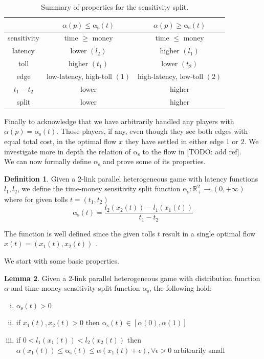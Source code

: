 \documentclass[10pt,a4paper]{book}
\newcommand{\as}{\mathrm{\alpha_s}}
\newcommand{\R}{\mathbb{R}}
\theoremstyle{definition}
\newtheorem{definition}{Definition}[chapter]
\newtheorem{lemma}[definition]{Lemma}
\theoremstyle{comment}
\begin{document}
\begin{table}[h!]
	\centering
	\caption{Summary of properties for the sensitivity split.}
	\begin{tabular}{| c || c | c |}
		\hline
		& $\alpha(p) \le \as(t)$ & $\alpha(p) \ge \as(t)$ \\ \hline
		sensitivity & time $\ge$ money & time $\le$ money \\ \hline
		latency & lower $(l_2)$ & higher $(l_1)$ \\ \hline
		toll & higher $(t_1)$ & lower $(t_2)$ \\ \hline
		edge & low-latency, high-toll $(1)$ & high-latency, low-toll $(2)$ \\ \hline
		$t_1 - t_2$ & lower & higher \\ \hline
		split & lower & higher \\ \hline
	\end{tabular}
	\label{table:split_summary}
\end{table}

Finally to acknowledge that we have arbitrarily handled any players with $\alpha(p) = \as(t)$.
Those players, if any, even though they see both edges with equal total cost, in the optimal flow $x$ they have settled in either edge $1$ or $2$.
We investigate more in depth the relation of $\as$ to the flow in [TODO: add ref].
\\[12pt]
We can now formally define $\as$ and prove some of its properties.
\begin{definition}
	Given a 2-link parallel heterogeneous game with latency functions $l_1, l_2$, we define the time-money sensitivity split function $\as: \R^2_+ \rightarrow (0, +\infty)$ where for given tolls $t = (t_1, t_2)$
	\[\as(t) = \frac{l_2(x_2(t)) - l_1(x_1(t))}{t_1 - t_2}\]
\end{definition}
The function is well defined since the given tolls $t$ result in a single optimal flow $x(t) = (x_1(t), x_2(t))$ \cite{Harks_2019}.

We start with some basic properties.
\begin{lemma}
	\label{lemma:split_basic}
	Given a 2-link parallel heterogeneous game with distribution function $\alpha$ and time-money sensitivity split function $\as$, the following hold:
	\begin{enumerate}[(i)]
		\item $\as(t) > 0$
		\item if $x_1(t), x_2(t) > 0$ then $\as(t) \in [\alpha(0), \alpha(1)]$
		\item if $0 < l_1(x_1(t)) < l_2(x_2(t))$ then $\alpha(x_1(t)) \le \as(t) \le \alpha(x_1(t) + \epsilon), \forall \epsilon > 0$ arbitrarily small
	\end{enumerate}
\end{lemma}
\end{document}
